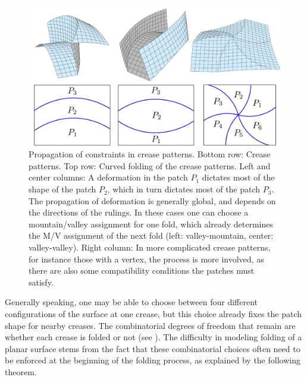 \begin{figure} [t]
	\centering
	\includegraphics[width=\linewidth]{figures/multiple_crease_patterns}
	\caption{Propagation of constraints in crease patterns. Bottom row: Crease patterns. Top row: Curved folding of the crease patterns. Left and center columns: A deformation in the patch $P_1$ dictates most of the shape of the patch $P_2$, which in turn dictates most of the patch $P_3$. The propagation of deformation is generally global, and depends on the directions of the rulings. In these cases one can choose a mountain/valley assignment for one fold, which already determines the M/V assignment of the next fold (left: valley-mountain, center: valley-valley). Right column: In more complicated crease patterns, for instance those with a vertex, the process is more involved, as there are also some compatibility conditions the patches must satisfy. }
	\label{fig:multiple_crease_patterns}
\end{figure}

Generally speaking, one may be able to choose between four different configurations of the surface at one crease, but this choice already fixes the patch shape for nearby creases. The combinatorial degrees of freedom that remain are whether each crease is folded or not (see ). The difficulty in modeling folding of a planar surface stems from the fact that these combinatorial choices often need to be enforced at the beginning of the folding process, as explained by the following theorem.%

